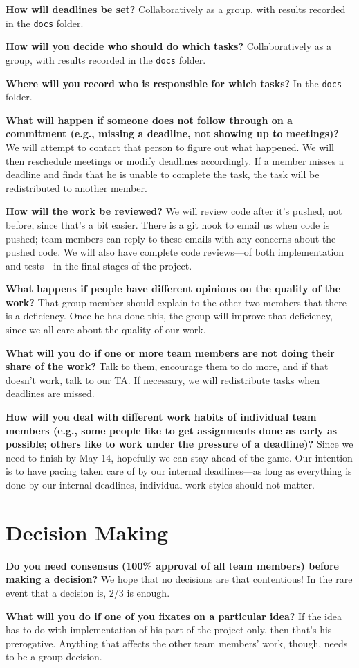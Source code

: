 \documentclass[11pt]{article}
\newcommand{\question}[2]{{\noindent\bf #1}\newline #2 \newline}
\begin{document}
\question{How will deadlines be set?}{
Collaboratively as a group, with results recorded in the \texttt{docs} folder.}

\question{How will you decide who should do which tasks?}{
Collaboratively as a group, with results recorded in the \texttt{docs} folder.}

\question{Where will you record who is responsible for which tasks?}{
In the \texttt{docs} folder.}

\question{What will happen if someone does not follow through on a commitment (e.g., missing a deadline, not showing up to meetings)?}{
We will attempt to contact that person to figure out what happened.  We will then reschedule meetings or modify deadlines accordingly.  If a member misses a deadline and finds that he is unable to complete the task, the task will be redistributed to another member.}

\question{How will the work be reviewed?}{
We will review code after it's pushed, not before, since that's a bit easier. There is a git hook to email us when code is pushed; team members can reply to these emails with any concerns about the pushed code.  We will also have complete code reviews---of both implementation and tests---in the final stages of the project.}

\question{What happens if people have different opinions on the quality of the work?}{
That group member should explain to the other two members that there is a deficiency.  Once he has done this, the group will improve that deficiency, since we all care about the quality of our work.}

\question{What will you do if one or more team members are not doing their share of the work?}{
Talk to them, encourage them to do more, and if that doesn't work, talk to our TA.  If necessary, we will redistribute tasks when deadlines are missed.}

\question{How will you deal with different work habits of individual team members (e.g., some people like to get assignments done as early as possible; others like to work under the pressure of a deadline)?}{
Since we need to finish by May 14, hopefully we can stay ahead of the game.  Our intention is to have pacing taken care of by our internal deadlines---as long as everything is done by our internal deadlines, individual work styles should not matter.}

\section{Decision Making}
\question{Do you need consensus (100\% approval of all team members) before making a decision?}{
We hope that no decisions are that contentious! In the rare event that a decision is, 2/3 is enough.}

\question{What will you do if one of you fixates on a particular idea?}{
If the idea has to do with implementation of his part of the project only, then that's his prerogative.  Anything that affects the other team members' work, though, needs to be a group decision.}
\end{document}
